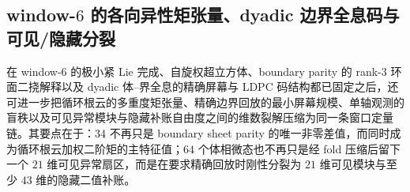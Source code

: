 \subsection{window-\texorpdfstring{$6$}{6} 的各向异性矩张量、dyadic 边界全息码与可见/隐藏分裂}\label{subsec:conclusion-window6-moment-ldpc-holography-hidden-split}
在 window-\(6\) 的极小紧 Lie 完成、自旋权超立方体、boundary parity 的 rank-\(3\) 环面二挠解释以及 dyadic 体--界全息的精确屏幕与 LDPC 码结构都已固定之后，还可进一步把循环根云的多重度矩张量、精确边界回放的最小屏幕规模、单轴观测的盲秩以及可见异常模块与隐藏补账自由度之间的维数裂解压缩为同一条窗口定量链。其要点在于：\(34\) 不再只是 boundary sheet parity 的唯一非零差值，而同时成为循环根云加权二阶矩的主特征值；\(64\) 个体相微态也不再只是经 fold 压缩后留下一个 \(21\) 维可见异常扇区，而是在要求精确回放时刚性分裂为 \(21\) 维可见模块与至少 \(43\) 维的隐藏二值补账。

